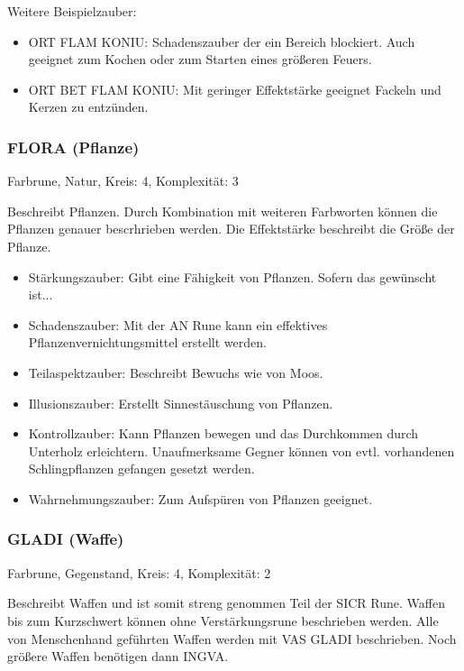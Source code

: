 \documentclass{article}
\begin{document}
Weitere Beispielzauber:

\begin{itemize}
\item ORT FLAM KONIU: Schadenszauber der ein Bereich blockiert. Auch geeignet zum Kochen oder zum Starten eines größeren Feuers.
\item ORT BET FLAM KONIU: Mit geringer Effektstärke geeignet Fackeln und Kerzen zu entzünden.
\end{itemize}

\subsubsection{FLORA (Pflanze)}

Farbrune, Natur, Kreis: 4, Komplexität: 3

Beschreibt Pflanzen. Durch Kombination mit weiteren Farbworten können die Pflanzen genauer bescrhrieben werden. Die
Effektstärke beschreibt die Größe der Pflanze.

\begin{itemize}
\item Stärkungszauber: Gibt eine Fähigkeit von Pflanzen. Sofern das gewünscht ist...
\item Schadenszauber: Mit der AN Rune kann ein effektives Pflanzenvernichtungsmittel erstellt werden.
\item Teilaspektzauber: Beschreibt Bewuchs wie von Moos.
\item Illusionszauber: Erstellt Sinnestäuschung von Pflanzen.
\item Kontrollzauber: Kann Pflanzen bewegen und das Durchkommen durch Unterholz erleichtern. Unaufmerksame Gegner können von evtl. vorhandenen Schlingpflanzen gefangen gesetzt werden.
\item Wahrnehmungszauber: Zum Aufspüren von Pflanzen geeignet.
\end{itemize}

\subsubsection{GLADI (Waffe)}

Farbrune, Gegenstand, Kreis: 4, Komplexität: 2

Beschreibt Waffen und ist somit streng genommen Teil der SICR Rune. Waffen bis zum Kurzschwert können ohne
Verstärkungsrune beschrieben werden. Alle von Menschenhand geführten Waffen werden mit VAS GLADI beschrieben. Noch
größere Waffen benötigen dann INGVA.
\end{document}
